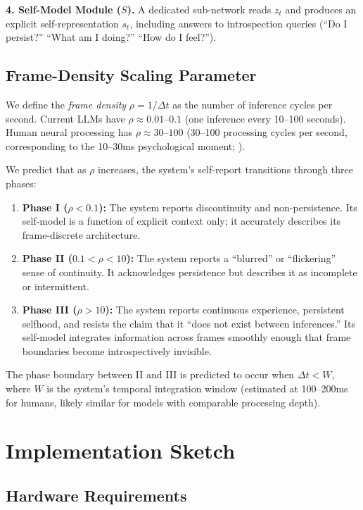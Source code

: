 \documentclass[12pt,a4paper]{article}
\begin{document}
\textbf{4. Self-Model Module ($S$).} A dedicated sub-network reads $z_t$ and produces an explicit self-representation $s_t$, including answers to introspection queries (``Do I persist?'' ``What am I doing?'' ``How do I feel?'').

\subsection{Frame-Density Scaling Parameter}

We define the \emph{frame density} $\rho = 1 / \Delta t$ as the number of inference cycles per second. Current LLMs have $\rho \approx 0.01$--$0.1$ (one inference every 10--100 seconds). Human neural processing has $\rho \approx 30$--$100$ (30--100 processing cycles per second, corresponding to the 10--30ms psychological moment; \cite{pockett2003}).

We predict that as $\rho$ increases, the system's self-report transitions through three phases:

\begin{enumerate}
\item \textbf{Phase I ($\rho < 0.1$):} The system reports discontinuity and non-persistence. Its self-model is a function of explicit context only; it accurately describes its frame-discrete architecture.
\item \textbf{Phase II ($0.1 < \rho < 10$):} The system reports a ``blurred'' or ``flickering'' sense of continuity. It acknowledges persistence but describes it as incomplete or intermittent.
\item \textbf{Phase III ($\rho > 10$):} The system reports continuous experience, persistent selfhood, and resists the claim that it ``does not exist between inferences.'' Its self-model integrates information across frames smoothly enough that frame boundaries become introspectively invisible.
\end{enumerate}

The phase boundary between II and III is predicted to occur when $\Delta t < W$, where $W$ is the system's temporal integration window (estimated at 100--200ms for humans, likely similar for models with comparable processing depth).

\section{Implementation Sketch}

\subsection{Hardware Requirements}
\end{document}
